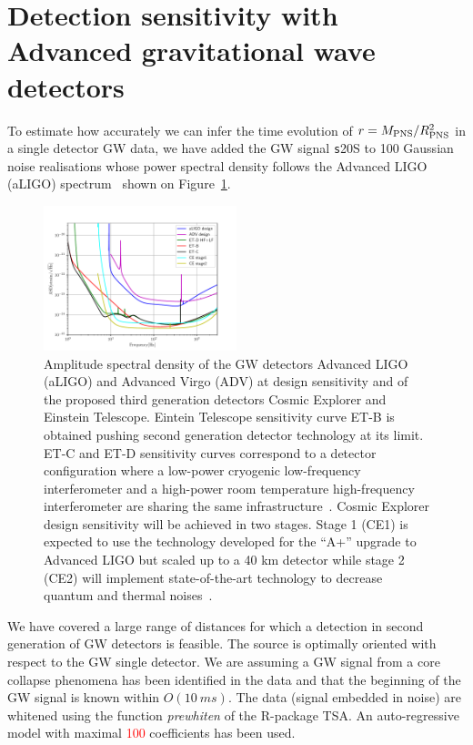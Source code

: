 \section{Detection sensitivity with Advanced gravitational wave detectors}
\label{sec:results}

To estimate how accurately we can infer the time evolution of $r=M_{\rm PNS}/R_{\rm PNS}^2$ in a single
detector GW data, we have added the GW signal {\texttt s20S} to 
100 Gaussian noise realisations whose power spectral density follows the Advanced LIGO (aLIGO)
spectrum~\cite{aLIGOsens:2018} shown on Figure~\ref{fig:spectrum}. 

\begin{figure}
 \centering
 \includegraphics[width=0.5\textwidth]{plots/spectrum}
 \caption{Amplitude spectral density of the GW detectors Advanced LIGO (aLIGO) and Advanced Virgo (ADV) at design sensitivity and of the proposed third generation detectors Cosmic Explorer and Einstein Telescope. Eintein Telescope sensitivity curve ET-B is obtained pushing second generation detector technology at its limit. ET-C and ET-D sensitivity curves correspond to a detector configuration where a low-power cryogenic low-frequency interferometer and a high-power room temperature high-frequency interferometer are sharing the same infrastructure~\cite{Hild_2011}. Cosmic Explorer design sensitivity will be achieved in two stages. Stage 1 (CE1) is expected to use the technology developed for the “A+” upgrade to Advanced LIGO but scaled up to a 40 km detector while stage 2 (CE2) will implement state-of-the-art technology to decrease quantum and thermal noises~\cite{reitze2019cosmic}. } \label{fig:spectrum}
\end{figure}

We have covered a large range of distances for which a detection in second generation of GW
detectors is feasible. The source is optimally oriented with
respect to the GW single detector. We are assuming a GW signal from a core collapse
phenomena has been identified in the data and that the beginning of the GW signal is known within $O(10~ms)$.
The data (signal embedded in noise) are whitened using the function {\it prewhiten} of the R-package TSA.
An auto-regressive model with maximal \textcolor{red}{100} coefficients has been used.    

